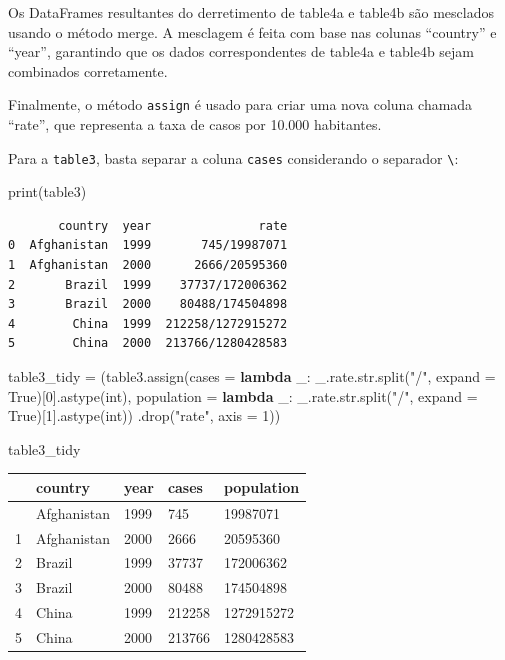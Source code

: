 \documentclass[
  portuguese,
  letterpaper,
  DIV=11,
  numbers=noendperiod]{scrreprt}
\newenvironment{Shaded}{\begin{snugshade}}{\end{snugshade}}
\newcommand{\BuiltInTok}[1]{\textcolor[rgb]{0.00,0.23,0.31}{#1}}
\newcommand{\DecValTok}[1]{\textcolor[rgb]{0.68,0.00,0.00}{#1}}
\newcommand{\KeywordTok}[1]{\textcolor[rgb]{0.00,0.23,0.31}{\textbf{#1}}}
\newcommand{\NormalTok}[1]{\textcolor[rgb]{0.00,0.23,0.31}{#1}}
\newcommand{\OperatorTok}[1]{\textcolor[rgb]{0.37,0.37,0.37}{#1}}
\newcommand{\StringTok}[1]{\textcolor[rgb]{0.13,0.47,0.30}{#1}}
\newcommand{\VariableTok}[1]{\textcolor[rgb]{0.07,0.07,0.07}{#1}}
\theoremstyle{definition}
\theoremstyle{remark}
\begin{document}
Os DataFrames resultantes do derretimento de table4a e table4b são
mesclados usando o método merge. A mesclagem é feita com base nas
colunas ``country'' e ``year'', garantindo que os dados correspondentes
de table4a e table4b sejam combinados corretamente.

Finalmente, o método \texttt{assign} é usado para criar uma nova coluna
chamada ``rate'', que representa a taxa de casos por 10.000 habitantes.

Para a \texttt{table3}, basta separar a coluna \texttt{cases}
considerando o separador \texttt{\textbackslash{}}:

\begin{Shaded}
\begin{Highlighting}[]
\BuiltInTok{print}\NormalTok{(table3)}
\end{Highlighting}
\end{Shaded}

\begin{verbatim}
       country  year               rate
0  Afghanistan  1999       745/19987071
1  Afghanistan  2000      2666/20595360
2       Brazil  1999    37737/172006362
3       Brazil  2000    80488/174504898
4        China  1999  212258/1272915272
5        China  2000  213766/1280428583
\end{verbatim}

\begin{Shaded}
\begin{Highlighting}[]
\NormalTok{table3\_tidy }\OperatorTok{=}\NormalTok{ (table3.assign(cases }\OperatorTok{=} \KeywordTok{lambda}\NormalTok{ \_: \_.rate.}\BuiltInTok{str}\NormalTok{.split(}\StringTok{"/"}\NormalTok{, expand }\OperatorTok{=} \VariableTok{True}\NormalTok{)[}\DecValTok{0}\NormalTok{].astype(}\BuiltInTok{int}\NormalTok{),}
\NormalTok{                       population }\OperatorTok{=} \KeywordTok{lambda}\NormalTok{ \_: \_.rate.}\BuiltInTok{str}\NormalTok{.split(}\StringTok{"/"}\NormalTok{,  expand }\OperatorTok{=} \VariableTok{True}\NormalTok{)[}\DecValTok{1}\NormalTok{].astype(}\BuiltInTok{int}\NormalTok{))}
\NormalTok{               .drop(}\StringTok{"rate"}\NormalTok{, axis }\OperatorTok{=} \DecValTok{1}\NormalTok{))}

\NormalTok{table3\_tidy}
\end{Highlighting}
\end{Shaded}

\begin{longtable}[]{@{}lllll@{}}
\toprule\noalign{}
& country & year & cases & population \\
\midrule\noalign{}
\endhead
\bottomrule\noalign{}
\endlastfoot
0 & Afghanistan & 1999 & 745 & 19987071 \\
1 & Afghanistan & 2000 & 2666 & 20595360 \\
2 & Brazil & 1999 & 37737 & 172006362 \\
3 & Brazil & 2000 & 80488 & 174504898 \\
4 & China & 1999 & 212258 & 1272915272 \\
5 & China & 2000 & 213766 & 1280428583 \\
\end{longtable}
\end{document}
